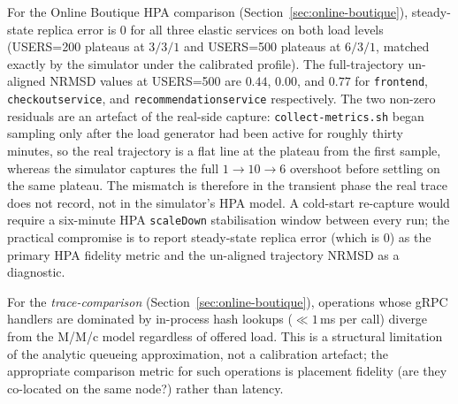 \documentclass[ASNA,twocolumn]{USG}
\begin{document}
    For the Online Boutique HPA comparison
    (Section~\ref{sec:online-boutique}), steady-state replica error is
    $0$ for all three elastic services on both load levels (USERS=200
    plateaus at $3/3/1$ and USERS=500 plateaus at $6/3/1$, matched
    exactly by the simulator under the calibrated profile). The
    full-trajectory un-aligned NRMSD values at USERS=500 are $0.44$,
    $0.00$, and $0.77$ for \texttt{frontend},
    \texttt{checkoutservice}, and \texttt{recommendationservice}
    respectively. The two non-zero residuals are an artefact of the
    real-side capture: \texttt{collect-metrics.sh} began sampling only
    after the load generator had been active for roughly thirty
    minutes, so the real trajectory is a flat line at the plateau from
    the first sample, whereas the simulator captures the full
    $1 \to 10 \to 6$ overshoot before settling on the same plateau.
    The mismatch is therefore in the transient phase the real trace
    does not record, not in the simulator's HPA model. A cold-start
    re-capture would require a six-minute HPA \texttt{scaleDown}
    stabilisation window between every run; the practical compromise
    is to report steady-state replica error (which is $0$) as the
    primary HPA fidelity metric and the un-aligned trajectory NRMSD
    as a diagnostic.

    For the \emph{trace-comparison} (Section~\ref{sec:online-boutique}),
    operations whose gRPC handlers are dominated by in-process hash lookups
    ($\ll 1\,$ms per call) diverge from the M/M/c model regardless of
    offered load. This is a structural limitation of the analytic queueing
    approximation, not a calibration artefact; the appropriate comparison
    metric for such operations is placement fidelity (are they co-located on
    the same node?) rather than latency.
\end{document}
